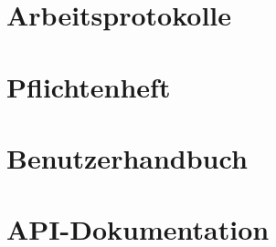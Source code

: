 \appendix

\chapter{Arbeitsprotokolle}




\chapter{Pflichtenheft}


\chapter{Benutzerhandbuch}
\chapter{API-Dokumentation}